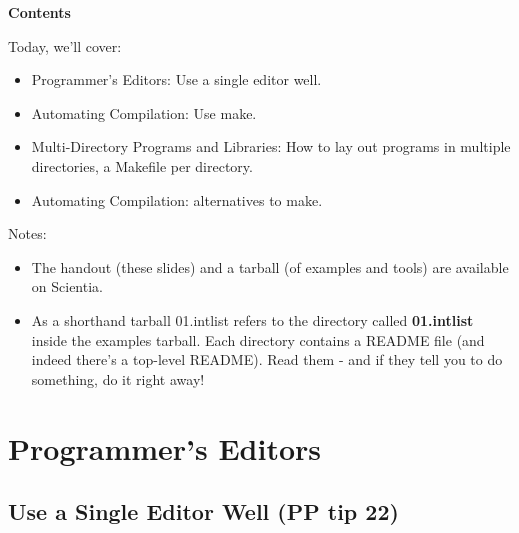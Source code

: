 \documentclass[aspectratio=169]{beamer}
\newcommand\myheading[1]{%
  \par\bigskip
  {\Large\bfseries#1}\par\smallskip}
\begin{document}
\begin{frame}[fragile]
  \myheading{Contents}
  Today, we'll cover:
      \begin{itemize}
        \item
          \alert{Programmer's Editors:} Use a single editor well.
        \item
	  \alert{Automating Compilation:} Use make.
        \item
   	  \alert{Multi-Directory Programs and Libraries:} How to lay out
	  programs in multiple directories, a Makefile per directory.
        \item
	  \alert{Automating Compilation:} alternatives to make.
	\end{itemize}
    \pause

    Notes:


    \begin{itemize}
    \item
    The handout (these slides) and a tarball (of examples and tools) are available on Scientia.

    \item
    As a shorthand \alert{tarball 01.intlist} refers to the directory
    called {\bf 01.intlist} inside the examples tarball.
    Each directory contains a README file (and indeed there's a top-level README).
    Read them - and if they tell you to do something, do it right away!
    \end{itemize}

\end{frame}



\section{Programmer's Editors}
\subsection{Use a Single Editor Well (PP tip 22)}
\end{document}
